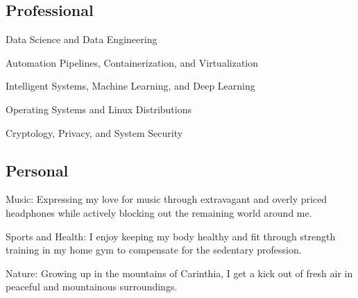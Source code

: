\documentclass[a4paper]{./src/resume-cv}
\begin{document}
\begin{minipage}[t]{0.42\textwidth}
	\subsection{Professional}
	\vspace{6pt} %
	\begin{tightemize}
		\item Data Science and Data Engineering
		\item Automation Pipelines, Containerization, and Virtualization
		\item Intelligent Systems, Machine Learning, and Deep Learning 
		\item Operating Systems and Linux Distributions
		\item Cryptology, Privacy, and System Security
	\end{tightemize}
	\subsectionsep
	
	\subsection{Personal}
	\vspace{6pt} %
	\begin{tightemize}
		\item \textsf{Music:} Expressing my love for music through extravagant and overly priced headphones while actively blocking out the remaining world around me.
		\item \textsf{Sports and Health:} I enjoy keeping my body healthy and fit through strength training in my home gym to compensate for the sedentary profession. 
		\item \textsf{Nature:} Growing up in the mountains of Carinthia, I get a kick out of fresh air in peaceful and mountainous surroundings.
	\end{tightemize}
	\subsectionsep
	
\end{minipage}\quad %
\hfill %
\end{document}
